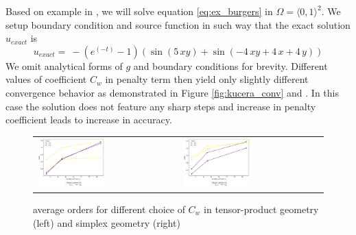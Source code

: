 \begin{example}
\label{ex:kucera}
Based on example in \cite[Section 1.6]{Kucera},
we will solve equation \eqref{eq:ex_burgers} in $\Omega = \langle 0, 1 \rangle^2$.
We setup boundary condition and source function in such way that the exact 
solution $u_{exact}$ is
\begin{equation}
	u_{exact} =  \ -{\left(e^{\left(-t\right)} - 1\right)} {\left(\sin\left(5 \,x 
	y\right) + \sin\left(-4 \, 
	x y + 4 \,x + 4 \, y\right)\right)}
\end{equation}
We omit analytical forms of $g$ and boundary conditions for brevity.
Different values of coefficient $C_w$ in penalty term then yield only slightly different 
convergence behavior as demonstrated in Figure \ref{fig:kucera_conv} and 
. In this case the solution does not feature any sharp steps and 
increase in penalty coefficient leads to increase in accuracy. 
\end{example}

\begin{figure}[h!]
	\centering
	\begin{tabular}{p{} p{}}
		\vspace{0pt} 
		\includegraphics[width=0.49\textwidth]{../figs/parametric/burgers_2D/orders_2_4}
		&
		\vspace{0pt} 
		\includegraphics[width=0.49\textwidth]{../figs/parametric/burgers_2D/orders_2_3}
	\end{tabular}
	\caption{ average orders for different choice of $C_w$ in 
	tensor-product geometry (left) and simplex geometry (right)}
	\label{fig:kucera_orders}
\end{figure}


